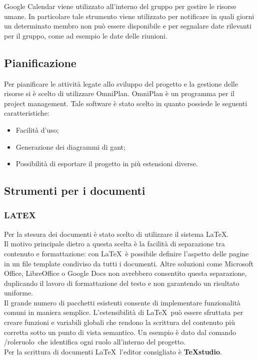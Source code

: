 Google Calendar viene utilizzato all’interno del gruppo per gestire le risorse umane. In
particolare tale strumento viene utilizzato per notificare in quali giorni un determinato
membro non può essere disponibile e per segnalare date rilevanti per il gruppo, come
ad esempio le date delle riunioni.
\subsection{Pianificazione}
Per pianificare le attività legate allo sviluppo del progetto e la gestione delle risorse si è scelto di utilizzare OmniPlan.
OmniPlan è un programma  per il project management. Tale software è stato scelto in quanto possiede le seguenti caratteristiche:
\begin{itemize}

\item Facilità d'uso;
\item Generazione dei diagrammi di gant;
\item Possibilità di esportare il progetto in più estensioni diverse.
\end{itemize}


\subsection{Strumenti per i documenti}
\label{sec:strumentiDocumenti}
\subsubsection{LATEX} 
 
Per la stesura dei documenti è stato scelto di utilizzare il sistema \LaTeX.\\
Il motivo 
principale dietro a questa scelta è la facilità di separazione tra contenuto e formattazione: 
con \LaTeX\ è possibile definire l’aspetto delle pagine in un file template condiviso da tutti i documenti. Altre soluzioni come Microsoft Office, LibreOffice o Google Docs non 
avrebbero consentito questa separazione, duplicando il lavoro di formattazione del testo 
e non garantendo un risultato uniforme.\\
Il grande numero di pacchetti esistenti consente di implementare funzionalità comuni 
in maniera semplice. L’estensibilità di \LaTeX\ può essere sfruttata per creare funzioni e 
variabili globali che rendono la scrittura del contenuto più corretta sotto un punto di 
vista semantico. Un esempio è dato dal comando /role\textbraceleft ruolo\textbraceright\ che identifica ogni ruolo 
all’interno del progetto.\\
Per la scrittura di documenti \LaTeX\  l’editor consigliato è \textbf{TeXstudio}. 


